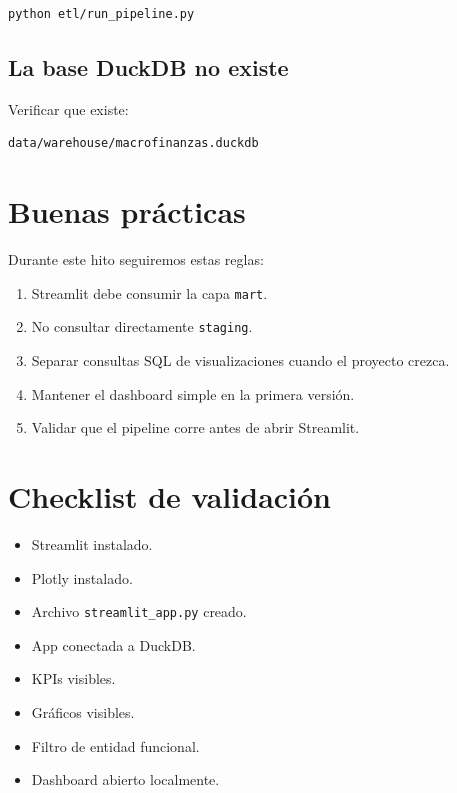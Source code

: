 \begin{lstlisting}[language=bash]
python etl/run_pipeline.py
\end{lstlisting}

\subsection{La base DuckDB no existe}

Verificar que existe:

\begin{verbatim}
data/warehouse/macrofinanzas.duckdb
\end{verbatim}

\section{Buenas prácticas}

Durante este hito seguiremos estas reglas:

\begin{enumerate}
\item Streamlit debe consumir la capa \texttt{mart}.
\item No consultar directamente \texttt{staging}.
\item Separar consultas SQL de visualizaciones cuando el proyecto crezca.
\item Mantener el dashboard simple en la primera versión.
\item Validar que el pipeline corre antes de abrir Streamlit.
\end{enumerate}

\section{Checklist de validación}

\begin{itemize}
\item[$\Box$] Streamlit instalado.
\item[$\Box$] Plotly instalado.
\item[$\Box$] Archivo \texttt{streamlit_app.py} creado.
\item[$\Box$] App conectada a DuckDB.
\item[$\Box$] KPIs visibles.
\item[$\Box$] Gráficos visibles.
\item[$\Box$] Filtro de entidad funcional.
\item[$\Box$] Dashboard abierto localmente.
\end{itemize}

